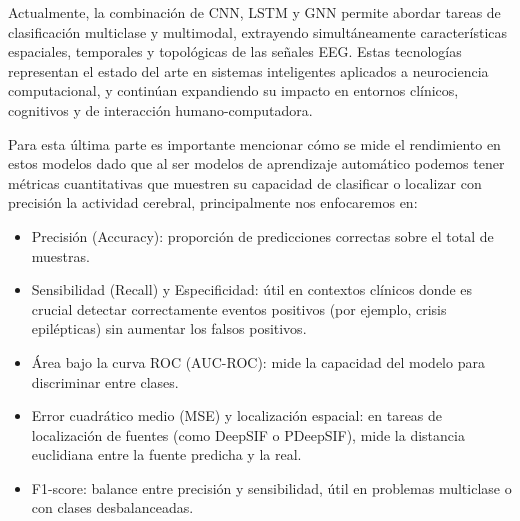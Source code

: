 Actualmente, la combinación de CNN, LSTM y GNN permite abordar tareas de clasificación multiclase y multimodal, extrayendo simultáneamente características espaciales\cite{Cui2019}, temporales y topológicas de las señales EEG. Estas tecnologías representan el estado del arte en sistemas inteligentes aplicados a neurociencia computacional, y continúan expandiendo su impacto en entornos clínicos, cognitivos y de interacción humano-computadora.

Para esta última parte es importante mencionar cómo se mide el rendimiento en estos modelos dado que al ser modelos de aprendizaje automático podemos tener métricas cuantitativas que muestren su capacidad de clasificar o localizar con precisión la actividad cerebral, principalmente nos enfocaremos en:

\begin{itemize}
    \item Precisión (Accuracy): proporción de predicciones correctas sobre el total de muestras.
    \item Sensibilidad (Recall) y Especificidad: útil en contextos clínicos donde es crucial detectar correctamente eventos positivos (por ejemplo, crisis epilépticas) sin aumentar los falsos positivos.
    \item Área bajo la curva ROC (AUC-ROC): mide la capacidad del modelo para discriminar entre clases.
    \item Error cuadrático medio (MSE) y localización espacial: en tareas de localización de fuentes (como DeepSIF o PDeepSIF), mide la distancia euclidiana entre la fuente predicha y la real.
    \item F1-score: balance entre precisión y sensibilidad, útil en problemas multiclase o con clases desbalanceadas.
\end{itemize}